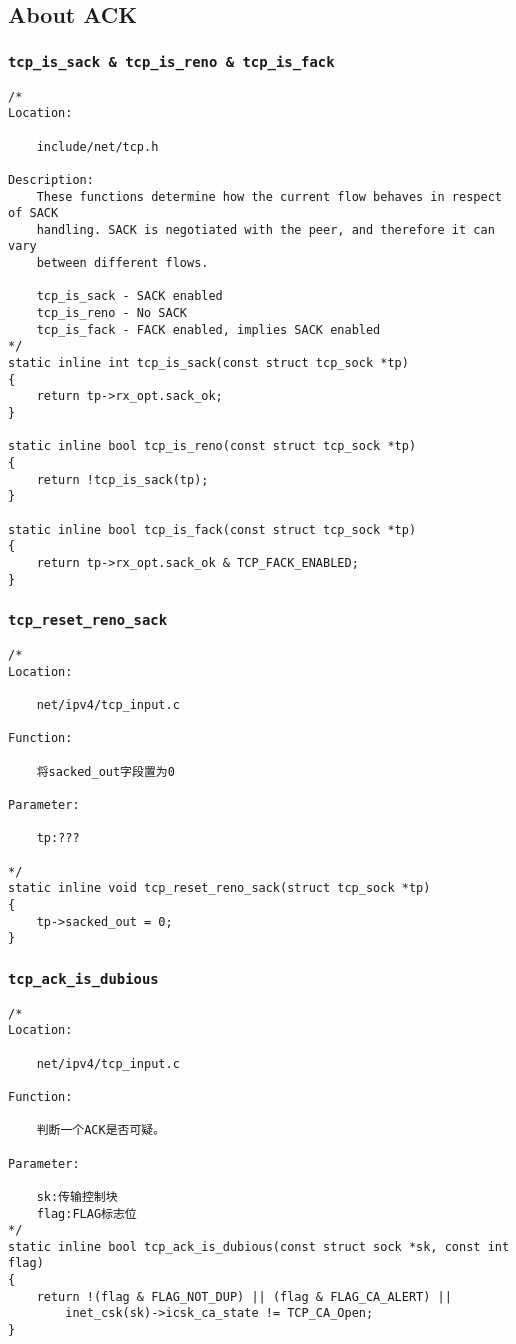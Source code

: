     \subsection{About ACK}
        \subsubsection{\texttt{tcp_is_sack & tcp_is_reno & tcp_is_fack}}
\begin{verbatim}
/* 
Location:

    include/net/tcp.h

Description:
    These functions determine how the current flow behaves in respect of SACK
    handling. SACK is negotiated with the peer, and therefore it can vary
    between different flows.

    tcp_is_sack - SACK enabled
    tcp_is_reno - No SACK
    tcp_is_fack - FACK enabled, implies SACK enabled
*/
static inline int tcp_is_sack(const struct tcp_sock *tp)
{
    return tp->rx_opt.sack_ok;
}

static inline bool tcp_is_reno(const struct tcp_sock *tp)
{
    return !tcp_is_sack(tp);
}

static inline bool tcp_is_fack(const struct tcp_sock *tp)
{
    return tp->rx_opt.sack_ok & TCP_FACK_ENABLED;
}
\end{verbatim}

        \subsubsection{\texttt{tcp_reset_reno_sack}}
\begin{verbatim}
/*
Location:

    net/ipv4/tcp_input.c

Function:

    将sacked_out字段置为0

Parameter:

    tp:???

*/
static inline void tcp_reset_reno_sack(struct tcp_sock *tp)
{
    tp->sacked_out = 0;
}
\end{verbatim}    
        \subsubsection{\texttt{tcp_ack_is_dubious}}
\begin{verbatim}
/*
Location:

    net/ipv4/tcp_input.c

Function:

    判断一个ACK是否可疑。

Parameter:

    sk:传输控制块
    flag:FLAG标志位
*/
static inline bool tcp_ack_is_dubious(const struct sock *sk, const int flag)
{
    return !(flag & FLAG_NOT_DUP) || (flag & FLAG_CA_ALERT) ||
        inet_csk(sk)->icsk_ca_state != TCP_CA_Open;
}
\end{verbatim}

